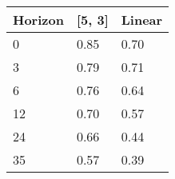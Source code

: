 \begin{table}[]
    \centering
    \begin{tabular}{lll}
\hline
Horizon	&	[5, 3]	&	Linear	\\
\hline \hline
0	&	0.85	&	0.70	\\
3	&	0.79	&	0.71	\\
6	&	0.76	&	0.64	\\
12	&	0.70	&	0.57	\\
24	&	0.66	&	0.44	\\
35	&	0.57	&	0.39	\\
\hline
    \end{tabular}
    \label{tab:ginicoeff}
\end{table}

